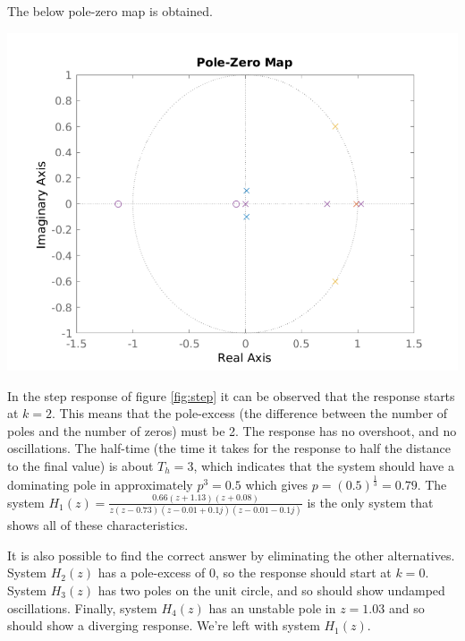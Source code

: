 \documentclass[letterpaper,12pt]{scrartcl}
\newenvironment{exercise}[1][Problem]{\begin{trivlist} \item[\hskip
    \labelsep {\stepcounter{exerctr}\bfseries #1
      \arabic{exerctr}}]}{\end{trivlist}\vspace{10mm}}
\newcounter{exerctr}
\begin{document}
\begin{exercise}

The below pole-zero map is obtained.
\begin{center}
  \includegraphics[width=0.7\linewidth]{BLDC-pzmap}
\end{center}  

In the step response of figure \ref{fig:step} it can be observed that the response starts at $k=2$. This means that the pole-excess (the difference between the number of poles and the number of zeros) must be 2. The response has no overshoot, and no oscillations. The half-time (the time it takes for the response to half the distance to the final value) is about $T_h=3$, which indicates that the system should have a dominating pole in approximately $p^3 = 0.5$ which gives $p=(0.5)^{\frac{1}{3}}=0.79$. The system  $H_1(z) = \frac{0.66(z+1.13)(z+0.08)}{z(z-0.73)(z-0.01 + 0.1j)(z-0.01 - 0.1j)} $ is the only system that shows all of these characteristics. 

It is also possible to find the correct answer by eliminating the other alternatives. System $H_2(z)$ has a pole-excess of 0, so the response should start at $k=0$. System $H_3(z)$ has two poles on the unit circle, and so should show undamped oscillations. Finally, system $H_4(z)$ has an unstable pole in $z=1.03$ and so should show a diverging response. We're left with system $H_1(z)$.

\end{exercise}
\end{document}
